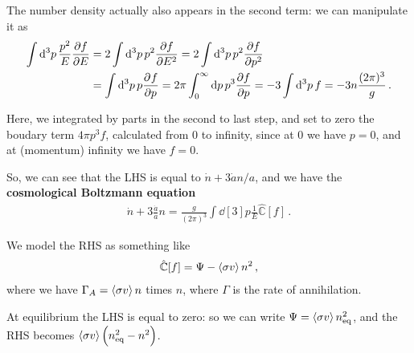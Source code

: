 \documentclass[main.tex]{subfiles}
\begin{document}
The number density actually also appears in the second term: we can manipulate it as
%
\begin{subequations}
\begin{align}
  \int \dd[3]{p} \frac{p^2}{E} \pdv{f}{E} 
  &= 2 \int \dd[3]{p} p^2 \pdv{f}{E^2} 
  = 2 \int \dd[3]{p} p^2 \pdv{f}{p^2}  \\
  &= \int \dd[3]{p} p \pdv[]{f}{p} 
  = 2 \pi \int_{0}^{ \infty } \dd{p} p^3 \pdv{f}{p} 
  = -3 \int \dd[3]{p} f = -3n \frac{(2 \pi )^3}{g}
\,.
\end{align}
\end{subequations}

Here, we integrated by parts in the second to last step, and set to zero the boudary term \(4 \pi p^3 f\), calculated from 0 to infinity, since at \(0\) we have \(p=0\), and at (momentum) infinity we have \(f=0\).

So, we can see that the LHS is equal to \(\dot{n} + 3 \dot{a}n/a \), and we have the \textbf{cosmological Boltzmann equation}
%
\begin{align}
  \dot{n} + 3 \frac{\dot{a}}{a} n = \frac{g}{(2 \pi )^3} \int \dd[3]{p} \frac{1}{E} \hat{\mathbb{C}} [f]
\,.
\end{align}


We model the RHS as something like 
%
\begin{align}
  \hat{\mathbb{C}}[f] = \Psi - \expval{\sigma v } n^2
\,,
\end{align}
%
where we have \(\Gamma_A = \expval{\sigma v} n\) times \(n\), where \(\Gamma \) is the rate of annihilation. 

At equilibrium the LHS is 
equal to zero: so we can write \(\Psi = \expval{\sigma v} n^2 _{\text{eq}}\), and the RHS becomes \(\expval{\sigma v} \qty(n^2 _{\text{eq}} - n^2)\).
\end{document}
